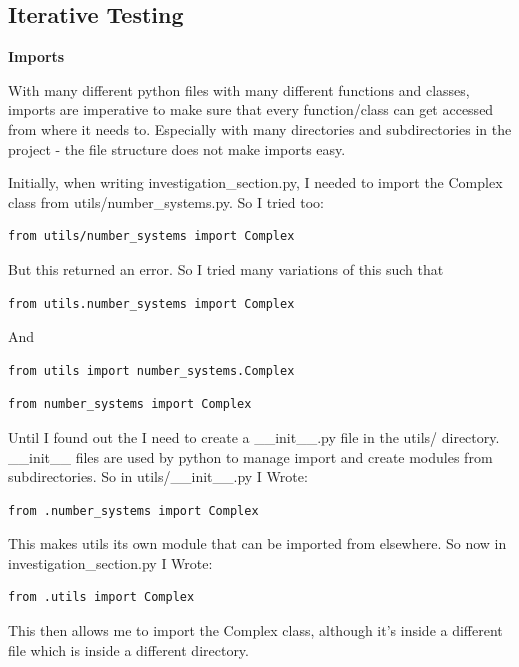\documentclass{article}
\begin{document}
\subsection{Iterative Testing}

\textbf{Imports}

With many different python files with many different functions and classes, imports are imperative to make sure that  every function/class can get accessed from where it needs to. Especially with many directories and subdirectories in the project - the file structure does not make imports easy.

Initially, when writing investigation\_section.py, I needed to import the Complex class from utils/number\_systems.py. So I tried too:

\begin{lstlisting}
from utils/number_systems import Complex
\end{lstlisting}

But this returned an error. So I tried many variations of this such that

\begin{lstlisting}
from utils.number_systems import Complex
\end{lstlisting}

And

\begin{lstlisting}
from utils import number_systems.Complex
\end{lstlisting}

\begin{lstlisting}
from number_systems import Complex
\end{lstlisting}

Until I found out the I need to create a \_\_init\_\_.py file in the utils/ directory. \_\_init\_\_ files are used by python to manage import and create modules from subdirectories.
So in utils/\_\_init\_\_.py I Wrote:

\begin{lstlisting}
from .number_systems import Complex
\end{lstlisting}

This makes utils its own module that can be imported from elsewhere. So now in investigation\_section.py I Wrote:

\begin{lstlisting}
from .utils import Complex
\end{lstlisting}

This then allows me to import the Complex class, although it's inside a different file which is inside a different directory.
\end{document}
